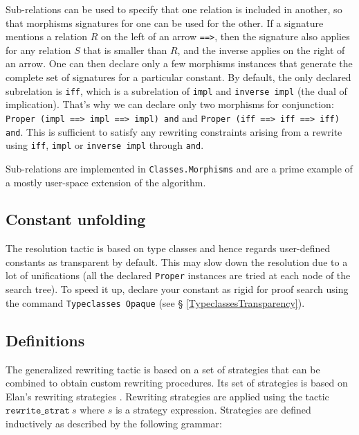 Sub-relations can be used to specify that one relation is included in
another, so that morphisms signatures for one can be used for the other.
If a signature mentions a relation $R$ on the left of an arrow
\texttt{==>}, then the signature also applies for any relation $S$ that
is smaller than $R$, and the inverse applies on the right of an arrow. 
One can then declare only a few morphisms instances that generate the complete set
of signatures for a particular constant. By default, the only declared
subrelation is \texttt{iff}, which is a subrelation of \texttt{impl}
and \texttt{inverse impl} (the dual of implication). That's why we can
declare only two morphisms for conjunction:
\texttt{Proper (impl ==> impl ==> impl) and} and 
\texttt{Proper (iff ==> iff ==> iff) and}. This is sufficient to satisfy
any rewriting constraints arising from a rewrite using \texttt{iff},
\texttt{impl} or \texttt{inverse impl} through \texttt{and}.

Sub-relations are implemented in \texttt{Classes.Morphisms} and are a 
prime example of a mostly user-space extension of the algorithm.

\subsection{Constant unfolding}

The resolution tactic is based on type classes and hence regards user-defined 
constants as transparent by default. This may slow down the resolution
due to a lot of unifications (all the declared \texttt{Proper}
instances are tried at each node of the search tree).
To speed it up, declare your constant as rigid for proof search
using the command \texttt{Typeclasses Opaque} (see \S
\ref{TypeclassesTransparency}).


\subsection{Definitions}
The generalized rewriting tactic is based on a set of strategies that
can be combined to obtain custom rewriting procedures. Its set of
strategies is based on Elan's rewriting strategies
\cite{Luttik97specificationof}. Rewriting strategies are applied using
the tactic $\texttt{rewrite\_strat}~s$ where $s$ is a strategy
expression. Strategies are defined inductively as described by the
following grammar:

\def\str#1{\texttt{#1}}

